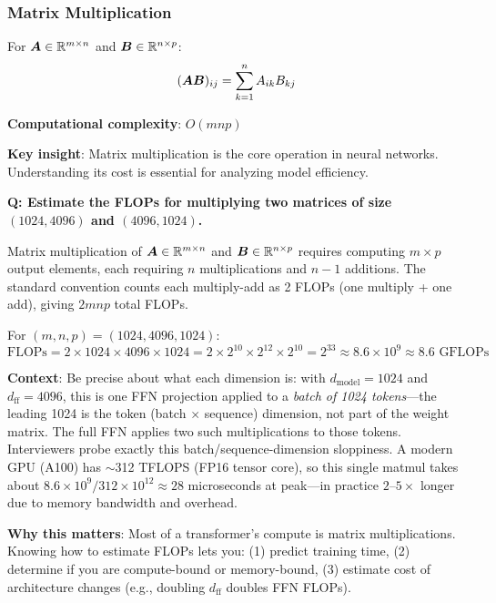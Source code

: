 \subsubsection{Matrix Multiplication}

For $\bm{A} \in \mathbb{R}^{m \times n}$ and $\bm{B} \in \mathbb{R}^{n \times p}$:
\begin{equation}
(\bm{A}\bm{B})_{ij} = \sum_{k=1}^n A_{ik} B_{kj}
\end{equation}

\textbf{Computational complexity}: $O(mnp)$

\textbf{Key insight}: Matrix multiplication is the core operation in neural networks. Understanding its cost is essential for analyzing model efficiency.

\begin{interviewq}
\textbf{Q: Estimate the FLOPs for multiplying two matrices of size $(1024, 4096)$ and $(4096, 1024)$.}

 \quad {} \quad \badgefreq{\freqmed}

\stronganswer
Matrix multiplication of $\bm{A} \in \mathbb{R}^{m \times n}$ and $\bm{B} \in \mathbb{R}^{n \times p}$ requires computing $m \times p$ output elements, each requiring $n$ multiplications and $n-1$ additions. The standard convention counts each multiply-add as 2 FLOPs (one multiply + one add), giving $2mnp$ total FLOPs.

For $(m, n, p) = (1024, 4096, 1024)$:
$$\text{FLOPs} = 2 \times 1024 \times 4096 \times 1024 = 2 \times 2^{10} \times 2^{12} \times 2^{10} = 2^{33} \approx 8.6 \times 10^9 \approx 8.6 \text{ GFLOPs}$$

\textbf{Context}: Be precise about what each dimension is: with $d_{\text{model}} = 1024$ and $d_{\text{ff}} = 4096$, this is one FFN projection applied to a \textit{batch of 1024 tokens}---the leading 1024 is the token (batch $\times$ sequence) dimension, not part of the weight matrix. The full FFN applies two such multiplications to those tokens. Interviewers probe exactly this batch/sequence-dimension sloppiness. A modern GPU (A100) has $\sim$312 TFLOPS (FP16 tensor core), so this single matmul takes about $8.6 \times 10^9 / 312 \times 10^{12} \approx 28$ microseconds at peak---in practice $2$--$5\times$ longer due to memory bandwidth and overhead.

\textbf{Why this matters}: Most of a transformer's compute is matrix multiplications. Knowing how to estimate FLOPs lets you: (1) predict training time, (2) determine if you are compute-bound or memory-bound, (3) estimate cost of architecture changes (e.g., doubling $d_{\text{ff}}$ doubles FFN FLOPs).


\end{interviewq}
